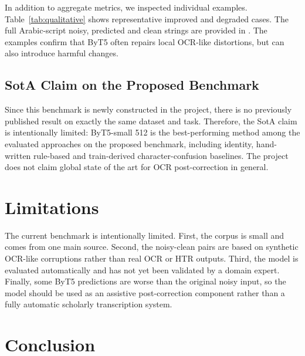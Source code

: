 \documentclass{article}
\begin{document}
In addition to aggregate metrics, we inspected individual examples. Table~\ref{tab:qualitative} shows representative improved and degraded cases. The full Arabic-script noisy, predicted and clean strings are provided in . The examples confirm that ByT5 often repairs local OCR-like distortions, but can also introduce harmful changes.

\begin{table}[tbh!]
\begin{center}
\small

\caption{Representative qualitative examples for ByT5-small 512. Positive $\Delta$ values mean improvement over the noisy input.}
\label{tab:qualitative}
\end{center}
\end{table}

\subsection{SotA Claim on the Proposed Benchmark}

Since this benchmark is newly constructed in the project, there is no previously published result on exactly the same dataset and task. Therefore, the SotA claim is intentionally limited: ByT5-small 512 is the best-performing method among the evaluated approaches on the proposed benchmark, including identity, hand-written rule-based and train-derived character-confusion baselines. The project does not claim global state of the art for OCR post-correction in general.


\section{Limitations}

The current benchmark is intentionally limited. First, the corpus is small and comes from one main source. Second, the noisy-clean pairs are based on synthetic OCR-like corruptions rather than real OCR or HTR outputs. Third, the model is evaluated automatically and has not yet been validated by a domain expert. Finally, some ByT5 predictions are worse than the original noisy input, so the model should be used as an assistive post-correction component rather than a fully automatic scholarly transcription system.

\section{Conclusion}
\end{document}
